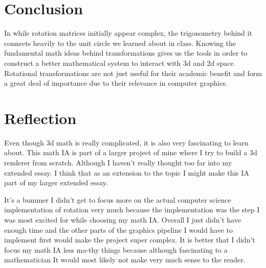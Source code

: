\section{Conclusion}
\hspace{\parindent}%
In while rotation matrices initially appear complex, the trigonometry behind it connects heavily to the unit circle we learned about in class. Knowing the fundamental math ideas behind transformations gives us the tools in order to construct a better mathematical system to interact with 3d and 2d space. Rotational transformations are not just useful for their academic benefit and form a great deal of importance due to their relevance in computer graphics. 
\section{Reflection}
\hspace{\parindent}%
Even though 3d math is really complicated, it is also very fascinating to learn about. This math IA is part of a larger project of mine where I try to build a 3d renderer from scratch. Although I haven't really thought too far into my extended essay. I think that as an extension to the topic I might make this IA part of my larger extended essay. 

It's a bummer I didn’t get to focus more on the actual computer science implementation of rotation very much because the implementation was the step I was most excited for while choosing my math IA. Overall I just didn’t have enough time and the other parts of the graphics pipeline I would have to implement first would make the project super complex. It is better that I didn’t focus my math IA less ma-thy things because although fascinating to a mathematician It would most likely not make very much sense to the reader.




